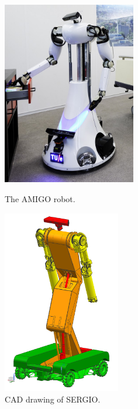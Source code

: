 \begin{figure}[ht]
	\begin{minipage}[t]{0.48\textwidth}
		\centering
		\includegraphics[height = 8.0cm]{Figures/amigo.jpg}		\caption{The AMIGO robot.}
		\label{fig:amigo}
	\end{minipage}
	\hfill
	\begin{minipage}[t]{0.48\textwidth}
		\centering
		\includegraphics[height = 8.0cm]{Figures/sergio.png}		\caption{CAD drawing of SERGIO.}
		\label{fig:sergio}
	\end{minipage}
\end{figure} 